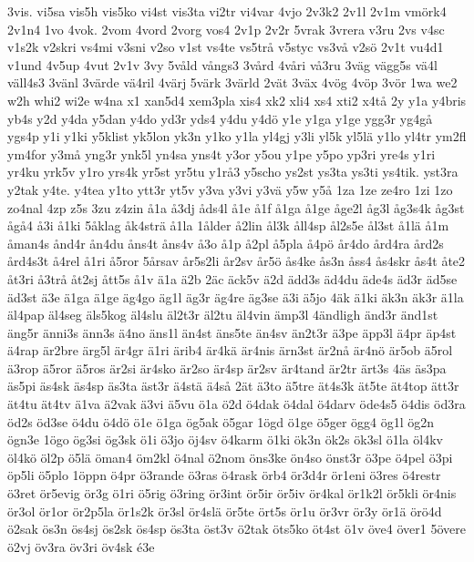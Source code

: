{3vis.
vi5sa
vis5h
vis5ko
vi4st
vis3ta
vi2tr
vi4var
4vjo
2v3k2
2v1l
2v1m
vm^^f6rk4
2v1n4
1vo
4vok.
2vom
4vord
2vorg
vos4
2v1p
2v2r
5vrak
3vrera
v3ru
2vs
v4sc
v1s2k
v2skri
vs4mi
v3sni
v2so
v1st
vs4te
vs5tr^^e5
v5styc
vs3v^^e5
v2s^^f6
2v1t
vu4d1
v1und
4v5up
4vut
2v1v
3vy
5v^^e5ld
v^^e5ngs3
3v^^e5rd
4v^^e5ri
v^^e53ru
3v^^e4g
v^^e4gg5s
v^^e44l
v^^e4ll4s3
3v^^e4nl
3v^^e4rde
v^^e44ril
4v^^e4rj
5v^^e4rk
3v^^e4rld
2v^^e4t
3v^^e4x
4v^^f6g
4v^^f6p
3v^^f6r
1wa
we2
w2h
whi2
wi2e
w4na
x1
xan5d4
xem3pla
xis4
xk2
xli4
xs4
xti2
x4t^^e5
2y
y1a
y4bris
yb4s
y2d
y4da
y5dan
y4do
yd3r
yds4
y4du
y4d^^f6
y1e
y1ga
y1ge
ygg3r
yg4g^^e5
ygs4p
y1i
y1ki
y5klist
yk5lon
yk3n
y1ko
y1la
yl4gj
y3li
yl5k
yl5l^^e4
y1lo
yl4tr
ym2fl
ym4for
y3m^^e5
yng3r
ynk5l
yn4sa
yns4t
y3or
y5ou
y1pe
y5po
yp3ri
yre4s
y1ri
yr4ku
yrk5v
y1ro
yrs4k
yr5st
yr5tu
y1r^^e53
y5scho
ys2st
ys3ta
ys3ti
ys4tik.
yst3ra
y2tak
y4te.
y4tea
y1to
ytt3r
yt5v
y3va
y3vi
y3v^^e4
y5w
y5^^e5
1za
1ze
ze4ro
1zi
1zo
zo4nal
4zp
z5s
3zu
z4zin
^^e51a
^^e53dj
^^e5ds4l
^^e51e
^^e51f
^^e51ga
^^e51ge
^^e5ge2l
^^e5g3l
^^e5g3s4k
^^e5g3st
^^e5g^^e54
^^e53i
^^e51ki
5^^e5klag
^^e5k4str^^e4
^^e51la
1^^e5lder
^^e52lin
^^e5l3k
^^e5ll4sp
^^e5l2s5e
^^e5l3st
^^e51l^^e4
^^e51m
^^e5man4s
^^e5nd4r
^^e5n4du
^^e5ns4t
^^e5ns4v
^^e53o
^^e51p
^^e52pl
^^e55pla
^^e54p^^f6
^^e5r4do
^^e5rd4ra
^^e5rd2s
^^e5rd4s3t
^^e54rel
^^e51ri
^^e55ror
5^^e5rsav
^^e5r5s2li
^^e5r2sv
^^e5r5^^f6
^^e5s4ke
^^e5s3n
^^e5ss4
^^e5s4skr
^^e5s4t
^^e5te2
^^e5t3ri
^^e53tr^^e5
^^e5t2sj
^^e5tt5s
^^e51v
^^e41a
^^e42b
2^^e4c
^^e4ck5v
^^e42d
^^e4dd3s
^^e4d4du
^^e4de4s
^^e4d3r
^^e4d5se
^^e4d3st
^^e43e
^^e41ga
^^e41ge
^^e4g4go
^^e4g1l
^^e4g3r
^^e4g4re
^^e4g3se
^^e43i
^^e45jo
4^^e4k
^^e41ki
^^e4k3n
^^e4k3r
^^e41la
^^e4l4pap
^^e4l4seg
^^e4ls5kog
^^e4l4slu
^^e4l2t3r
^^e4l2tu
^^e4l4vin
^^e4mp3l
4^^e4ndligh
^^e4nd3r
^^e4nd1st
^^e4ng5r
^^e4nni3s
^^e4nn3s
^^e44no
^^e4ns1l
^^e4n4st
^^e4ns5te
^^e4n4sv
^^e4n2t3r
^^e43pe
^^e4pp3l
^^e44pr
^^e4p4st
^^e44rap
^^e4r2bre
^^e4rg5l
^^e4r4gr
^^e41ri
^^e4rib4
^^e4r4k^^e4
^^e4r4nis
^^e4rn3st
^^e4r2n^^e5
^^e4r4n^^f6
^^e4r5ob
^^e45rol
^^e43rop
^^e45ror
^^e45ros
^^e4r2si
^^e4r4sko
^^e4r2so
^^e4r4sp
^^e4r2sv
^^e4r4tand
^^e4r2tr
^^e4rt3s
4^^e4s
^^e4s3pa
^^e4s5pi
^^e4s4sk
^^e4s4sp
^^e4s3ta
^^e4st3r
^^e44st^^e4
^^e44s^^e5
2^^e4t
^^e43to
^^e45tre
^^e4t4s3k
^^e4t5te
^^e4t4top
^^e4tt3r
^^e4t4tu
^^e4t4tv
^^e41va
^^e42vak
^^e43vi
^^e45vu
^^f61a
^^f62d
^^f64dak
^^f64dal
^^f64darv
^^f6de4s5
^^f64dis
^^f6d3ra
^^f6d2s
^^f6d3se
^^f64du
^^f64d^^f6
^^f61e
^^f61ga
^^f6g5ak
^^f65gar
1^^f6gd
^^f61ge
^^f65ger
^^f6gg4
^^f6g1l
^^f6g2n
^^f6gn3e
1^^f6go
^^f6g3si
^^f6g3sk
^^f61i
^^f63jo
^^f6j4sv
^^f64karm
^^f61ki
^^f6k3n
^^f6k2s
^^f6k3sl
^^f61la
^^f6l4kv
^^f6l4k^^f6
^^f6l2p
^^f65l^^e4
^^f6man4
^^f6m2kl
^^f64nal
^^f62nom
^^f6ns3ke
^^f6n4so
^^f6nst3r
^^f63pe
^^f64pel
^^f63pi
^^f6p5li
^^f65plo
1^^f6ppn
^^f64pr
^^f63rande
^^f63ras
^^f64rask
^^f6rb4
^^f6r3d4r
^^f6r1eni
^^f63res
^^f64restr
^^f63ret
^^f6r5evig
^^f6r3g
^^f61ri
^^f65rig
^^f63ring
^^f6r3int
^^f6r5ir
^^f6r5iv
^^f6r4kal
^^f6r1k2l
^^f6r5kli
^^f6r4nis
^^f6r3ol
^^f6r1or
^^f6r2p5la
^^f6r1s2k
^^f6r3sl
^^f6r4sl^^e4
^^f6r5te
^^f6rt5s
^^f6r1u
^^f6r3vr
^^f6r3y
^^f6r1^^e4
^^f6r^^f64d
^^f62sak
^^f6s3n
^^f6s4sj
^^f6s2sk
^^f6s4sp
^^f6s3ta
^^f6st3v
^^f62tak
^^f6ts5ko
^^f6t4st
^^f61v
^^f6ve4
^^f6ver1
5^^f6vere
^^f62vj
^^f6v3ra
^^f6v3ri
^^f6v4sk
^^e93e
}
